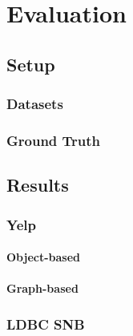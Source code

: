  \chapter{Evaluation}
 \section{Setup}
 \subsection{Datasets}
 \subsection{Ground Truth}
   
  \section{Results}
    \subsection{Yelp}
        \subsubsection{Object-based}
        \subsubsection{Graph-based}
        
    \subsection{LDBC SNB}
        